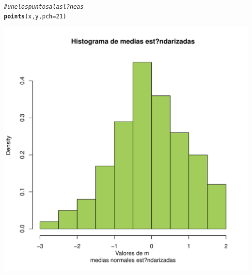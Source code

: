 \documentclass[10pt,a4paper]{article}\usepackage[]{graphicx}\usepackage[]{color}
\makeatletter
\def\maxwidth{ %
  \ifdim\Gin@nat@width>\linewidth
    \linewidth
  \else
    \Gin@nat@width
  \fi
}
\newcommand{\hlnum}[1]{\textcolor[rgb]{0.686,0.059,0.569}{#1}}%
\newcommand{\hlcom}[1]{\textcolor[rgb]{0.678,0.584,0.686}{\textit{#1}}}%
\newcommand{\hlstd}[1]{\textcolor[rgb]{0.345,0.345,0.345}{#1}}%
\newcommand{\hlkwc}[1]{\textcolor[rgb]{0.333,0.667,0.333}{#1}}%
\newcommand{\hlkwd}[1]{\textcolor[rgb]{0.737,0.353,0.396}{\textbf{#1}}}%
\newenvironment{kframe}{%
 \def\at@end@of@kframe{}%
 \ifinner\ifhmode%
  \def\at@end@of@kframe{\end{minipage}}%
  \begin{minipage}{\columnwidth}%
 \fi\fi%
 \def\FrameCommand##1{\hskip\@totalleftmargin \hskip-\fboxsep
 \colorbox{shadecolor}{##1}\hskip-\fboxsep
     \hskip-\linewidth \hskip-\@totalleftmargin \hskip\columnwidth}%
 \MakeFramed {\advance\hsize-\width
   \@totalleftmargin\z@ \linewidth\hsize
   \@setminipage}}%
 {\par\unskip\endMakeFramed%
 \at@end@of@kframe}
\newenvironment{knitrout}{}{} %
\makeatother
\begin{document}
\begin{knitrout}
\begin{kframe}
\begin{alltt}
\hlcom{#une los puntos a las l?neas }
\hlkwd{points}\hlstd{(x, y,} \hlkwc{pch}\hlstd{=}\hlnum{21}\hlstd{)}
\end{alltt}
\end{kframe}
\includegraphics[width=\maxwidth]{figure/unnamed-chunk-2-1} 

\end{knitrout}
\end{document}

